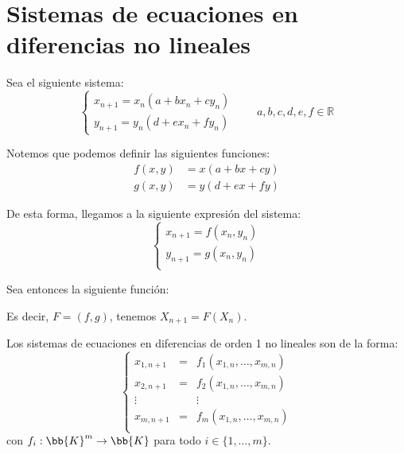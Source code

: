 \section{Sistemas de ecuaciones en diferencias no lineales}

\begin{ejemplo}
    Sea el siguiente sistema:
    \begin{equation*}
        \left\{\begin{array}{l}
                x_{n+1} = x_n(a+bx_n+cy_n)\\
                y_{n+1} = y_n(d+ex_n+fy_n)
        \end{array}\right. \qquad a,b,c,d,e,f \in \mathbb{R}
    \end{equation*}

    Notemos que podemos definir las siguientes funciones:
    \begin{align*}
        f(x,y) &= x(a+bx+cy)\\
        g(x,y) &= y(d+ex+fy)
    \end{align*}

    De esta forma, llegamos a la siguiente expresión del sistema:
    \begin{equation*}
        \left\{\begin{array}{l}
                x_{n+1} = f(x_n,y_n)\\
                y_{n+1} = g(x_n,y_n)\\
        \end{array}\right.
    \end{equation*}

    Sea entonces la siguiente función:

    Es decir, $F=(f,g)$, tenemos $X_{n+1}=F(X_n)$.\\
\end{ejemplo}

Los sistemas de ecuaciones en diferencias de orden 1 no lineales son de la forma:
\begin{equation*}
    \left\{ \begin{array}{ccc}
        x_{1,n+1} & = & f_1(x_{1,n},\dots,x_{m,n}) \\
        x_{2,n+1} & = & f_2(x_{1,n},\dots,x_{m,n}) \\
        \vdots &  & \vdots \\
        x_{m, n+1} & = & f_m(x_{1,n},\dots,x_{m,n}) \\
    \end{array}\right. 
\end{equation*}
con $f_i:\bb{K}^m\to \bb{K}$ para todo $i \in \{1, \ldots, m\}$.\\


